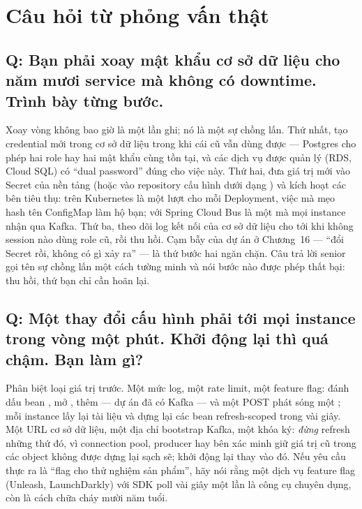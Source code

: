 \section{Câu hỏi từ phỏng vấn thật}

\subsection*{Q: Bạn phải xoay mật khẩu cơ sở dữ liệu cho năm mươi
service mà không có downtime. Trình bày từng bước.}

Xoay vòng không bao giờ là một lần ghi; nó là một sự chồng lấn. Thứ
nhất, tạo credential mới trong cơ sở dữ liệu trong khi cái cũ vẫn dùng
được --- Postgres cho phép hai role hay hai mật khẩu cùng tồn tại, và
các dịch vụ được quản lý (RDS, Cloud SQL) có ``dual password'' đúng cho
việc này. Thứ hai, đưa giá trị mới vào Secret của nền tảng (hoặc vào
repository cấu hình dưới dạng ) và kích hoạt các bên
tiêu thụ: trên Kubernetes là một lượt  cho mỗi
Deployment, việc mà mẹo hash tên ConfigMap làm hộ bạn; với Spring Cloud
Bus là một  mà mọi instance nhận qua
Kafka. Thứ ba, theo dõi log kết nối của cơ sở dữ liệu cho tới khi không
session nào dùng role cũ, rồi thu hồi. Cạm bẫy của dự án ở Chương~16
--- ``đổi Secret rồi, không có gì xảy ra'' --- là thứ bước hai ngăn
chặn. Câu trả lời senior gọi tên sự chồng lấn một cách tường minh và
nói bước nào được phép thất bại: thu hồi, thứ bạn chỉ cần hoãn lại.

\subsection*{Q: Một thay đổi cấu hình phải tới mọi instance trong vòng
một phút. Khởi động lại thì quá chậm. Bạn làm gì?}

Phân biệt loại giá trị trước. Một mức log, một rate limit, một feature
flag: đánh dấu bean , mở ,
thêm  --- dự án đã có Kafka --- và
một POST phát sóng một ; mỗi
instance lấy lại tài liệu và dựng lại các bean refresh-scoped trong vài
giây. Một URL cơ sở dữ liệu, một địa chỉ bootstrap Kafka, một khóa ký:
\emph{đừng} refresh những thứ đó, vì connection pool, producer hay bên
xác minh giữ giá trị cũ trong các object không được dựng lại sạch sẽ;
khởi động lại thay vào đó. Nếu yêu cầu thực ra là ``flag cho thử
nghiệm sản phẩm'', hãy nói rằng một dịch vụ feature flag (Unleash,
LaunchDarkly) với SDK poll vài giây một lần là công cụ chuyên dụng, còn
 là cách chữa cháy mười năm tuổi.

